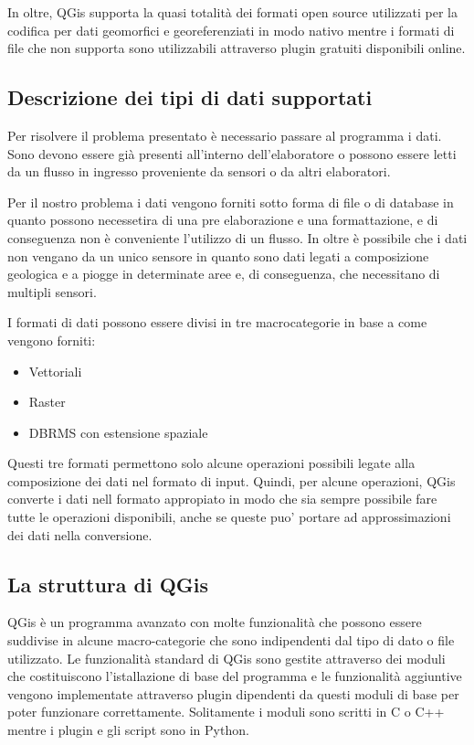 In oltre, QGis supporta la quasi totalità dei formati open source utilizzati per la codifica per dati geomorfici e georeferenziati in modo nativo mentre i formati di file che non supporta sono utilizzabili attraverso plugin gratuiti disponibili online.

\subsection{Descrizione dei tipi di dati supportati}

Per risolvere il problema presentato è necessario passare al programma i dati. Sono devono essere già presenti all'interno dell'elaboratore o possono essere letti da un flusso in ingresso proveniente da sensori o da altri elaboratori.

Per il nostro problema i dati vengono forniti sotto forma di file o di database in quanto possono necessetira di una pre elaborazione e una formattazione, e di conseguenza non è conveniente l'utilizzo di un flusso. In oltre è possibile che i dati non vengano da un unico sensore in quanto sono dati legati a composizione geologica e a piogge in determinate aree e, di conseguenza, che necessitano di multipli sensori.


I formati di dati possono essere divisi in tre macrocategorie in base a come vengono forniti:
\begin{itemize}
	\item Vettoriali
	\item Raster
	\item DBRMS con estensione spaziale
\end{itemize}

Questi tre formati permettono solo alcune operazioni possibili legate alla composizione dei dati nel formato di input.
Quindi, per alcune operazioni, QGis converte i dati nell formato appropiato in modo che sia sempre possibile fare tutte le operazioni disponibili, anche se queste puo' portare ad approssimazioni dei dati nella conversione.

\subsection{La struttura di QGis}
QGis è un programma avanzato con molte funzionalità che possono essere suddivise in alcune macro-categorie che sono indipendenti dal tipo di dato o file utilizzato.
Le funzionalità standard di QGis sono gestite attraverso dei moduli che costituiscono l'istallazione di base del programma e le funzionalità aggiuntive vengono implementate attraverso plugin dipendenti da questi moduli di base per poter funzionare correttamente.
Solitamente i moduli sono scritti in C o C++ mentre i plugin e gli script sono in Python.

